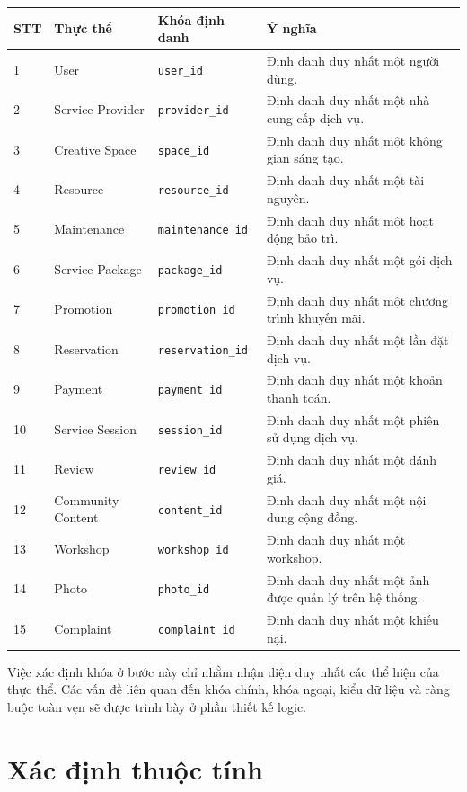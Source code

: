 \begin{center}
\scriptsize
\begin{tabular}{p{.05\linewidth} p{.20\linewidth} p{.17\linewidth} p{.34\linewidth}}
\toprule
STT & Thực thể & Khóa định danh & Ý nghĩa \\
\midrule
1 & User & \texttt{user\_id} & Định danh duy nhất một người dùng. \\
2 & Service Provider & \texttt{provider\_id} & Định danh duy nhất một nhà cung cấp dịch vụ. \\
3 & Creative Space & \texttt{space\_id} & Định danh duy nhất một không gian sáng tạo. \\
4 & Resource & \texttt{resource\_id} & Định danh duy nhất một tài nguyên. \\
5 & Maintenance & \texttt{maintenance\_id} & Định danh duy nhất một hoạt động bảo trì. \\
6 & Service Package & \texttt{package\_id} & Định danh duy nhất một gói dịch vụ. \\
7 & Promotion & \texttt{promotion\_id} & Định danh duy nhất một chương trình khuyến mãi. \\
8 & Reservation & \texttt{reservation\_id} & Định danh duy nhất một lần đặt dịch vụ. \\
9 & Payment & \texttt{payment\_id} & Định danh duy nhất một khoản thanh toán. \\
10 & Service Session & \texttt{session\_id} & Định danh duy nhất một phiên sử dụng dịch vụ. \\
11 & Review & \texttt{review\_id} & Định danh duy nhất một đánh giá. \\
12 & Community Content & \texttt{content\_id} & Định danh duy nhất một nội dung cộng đồng. \\
13 & Workshop & \texttt{workshop\_id} & Định danh duy nhất một workshop. \\
14 & Photo & \texttt{photo\_id} & Định danh duy nhất một ảnh được quản lý trên hệ thống. \\
15 & Complaint & \texttt{complaint\_id} & Định danh duy nhất một khiếu nại. \\
\bottomrule
\end{tabular}
\end{center}

Việc xác định khóa ở bước này chỉ nhằm nhận diện duy nhất các thể hiện của thực thể. Các vấn đề liên quan đến khóa chính, khóa ngoại, kiểu dữ liệu và ràng buộc toàn vẹn sẽ được trình bày ở phần thiết kế logic.

\section{Xác định thuộc tính}

